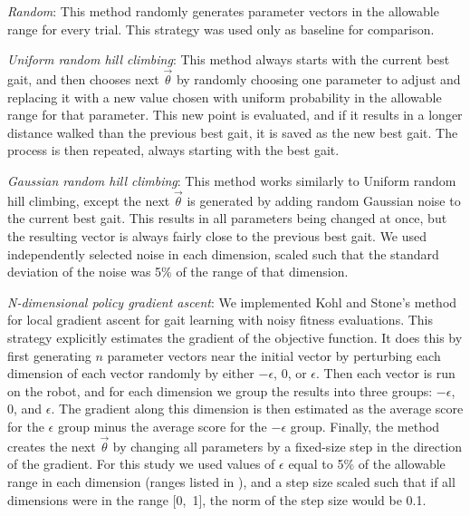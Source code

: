 


\emph{Random}: This method randomly generates parameter vectors in the allowable range for every trial.  This strategy was used only
  as baseline for comparison.

\emph{Uniform random hill climbing}: This method always starts
  with the current best gait, and then chooses next $\vec{\theta}$ by
  randomly choosing one parameter to adjust and replacing it with a
  new value chosen with uniform probability in the allowable range for
  that parameter. This new point is evaluated, and if it results in a
  longer distance walked than the previous best gait, it is saved as
  the new best gait. The process is then repeated, always starting
  with the best gait.

\emph{Gaussian random hill climbing}: This method works
  similarly to Uniform random hill climbing, except the next
  $\vec{\theta}$ is generated by adding random Gaussian noise to the
  current best gait.  This results in all parameters being changed at
  once, but the resulting vector is always fairly close to the
  previous best gait.  We used independently selected noise in each
  dimension, scaled such that the standard deviation of the noise was
  5\% of the range of that dimension.

\emph{N-dimensional policy gradient ascent}: We implemented Kohl
  and Stone's \cite{kohl} method for local gradient ascent for gait
  learning with noisy fitness evaluations. This strategy explicitly
  estimates the gradient of the objective function. It does this by
  first generating $n$ parameter vectors near the initial vector by
  perturbing each dimension of each vector randomly by either
  $-\epsilon$, $0$, or $\epsilon$. Then each vector is run on the
  robot, and for each dimension we group the results into three
  groups: $-\epsilon$, $0$, and $\epsilon$.  The gradient along this
  dimension is then estimated as the average score for the $\epsilon$
  group minus the average score for the $-\epsilon$ group. Finally,
  the method creates the next $\vec{\theta}$ by changing all
  parameters by a fixed-size step in the direction of the gradient.
  For this study we used values of $\epsilon$ equal to 5\% of the
  allowable range in each dimension (ranges listed in
  ), and a step size scaled such that if all dimensions
  were in the range [0,~1], the norm of the step size would be 0.1.

